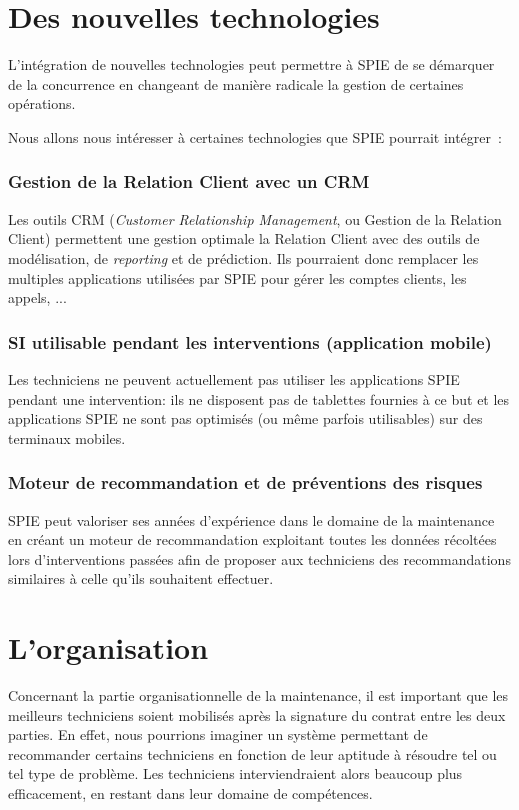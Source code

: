 \section{Des nouvelles technologies}

L'intégration de nouvelles technologies peut permettre à SPIE de se démarquer de la concurrence en changeant de manière radicale la gestion de certaines opérations.

Nous allons nous intéresser à certaines technologies que SPIE pourrait intégrer~:


    \subsubsection{Gestion de la Relation Client avec un CRM}

        Les outils CRM (\textit{Customer Relationship Management}, ou Gestion de la Relation Client) permettent une gestion optimale la Relation Client avec des outils de modélisation, de \textit{reporting} et de prédiction. Ils pourraient donc remplacer les multiples applications utilisées par SPIE pour gérer les comptes clients, les appels, ...

    \subsubsection{SI utilisable pendant les interventions (application mobile)}

        Les techniciens ne peuvent actuellement pas utiliser les applications SPIE pendant une intervention: ils ne disposent pas de tablettes fournies à ce but et les applications SPIE ne sont pas optimisés (ou même parfois utilisables) sur des terminaux mobiles.

    \subsubsection{Moteur de recommandation et de préventions des risques}

        SPIE peut valoriser ses années d'expérience dans le domaine de la maintenance en créant un moteur de recommandation exploitant toutes les données récoltées lors d'interventions passées afin de proposer aux techniciens des recommandations similaires à celle qu'ils souhaitent effectuer.

\section{L'organisation}
Concernant la partie organisationnelle de la maintenance, il est important que les meilleurs techniciens soient mobilisés après la signature du contrat entre les deux parties. En effet, nous pourrions imaginer un système permettant de recommander certains techniciens en fonction de leur aptitude à résoudre tel ou tel type de problème. Les techniciens interviendraient alors beaucoup plus efficacement, en restant dans leur domaine de compétences.

